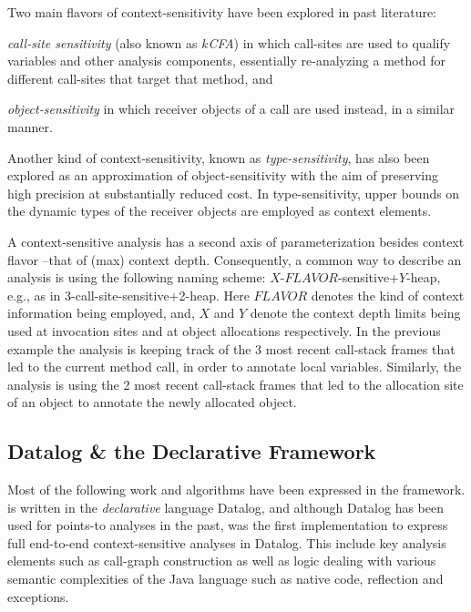 Two main flavors of context-sensitivity have been explored in past literature:
\begin{inparaenum}[(1)]
\item \emph{call-site sensitivity} (also known as \emph{$k$CFA}) \cite{col:1981:Sharir,thesis:Shivers} 
in which call-sites are used to qualify variables and other analysis components, essentially re-analyzing a method for different call-sites that target that method, and
\item \emph{object-sensitivity} \cite{issta:2002:Milanova,article:2005:Milanova,popl:2011:Smaragdakis} in which receiver objects of a call are used
	instead, in a similar manner.
\end{inparaenum}
Another kind of context-sensitivity, known as \emph{type-sensitivity}, has also
been explored as an approximation of object-sensitivity with the aim of
preserving high precision at substantially reduced cost. In type-sensitivity,
upper bounds on the dynamic types of the receiver objects are employed as
context elements. 

A context-sensitive analysis has a second axis of parameterization besides
context flavor --that of (max) context depth. Consequently, a common way to
describe an analysis is using the following naming scheme:
$X$-$FLAVOR$-sensitive+$Y$-heap, e.g., as in 3-call-site-sensitive+2-heap. Here
$FLAVOR$ denotes the kind of context information being employed, and, $X$ and
$Y$ denote the context depth limits being used at invocation sites and at
object allocations respectively. In the previous example the analysis is
keeping track of the 3 most recent call-stack frames that led to the current
method call, in order to annotate local variables. Similarly, the analysis is
using the 2 most recent call-stack frames that led to the allocation site of an
object to annotate the newly allocated object.


\subsection{Datalog \& the Declarative \doop{} Framework}

Most of the following work and algorithms have been expressed in the \doop{} framework. \doop{} is written in the \emph{declarative} language Datalog, and although Datalog has been used for points-to analyses in the past, \doop{} was the first implementation to express full end-to-end context-sensitive analyses in Datalog. This include key analysis elements such as call-graph construction as well as logic dealing with various semantic complexities of the Java language such as native code, reflection and exceptions.

